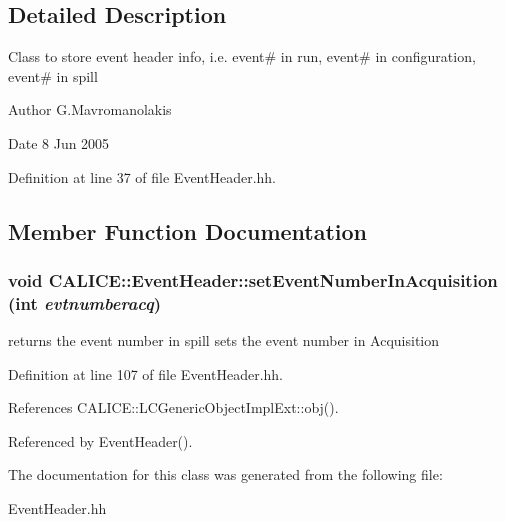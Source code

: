 \subsection{Detailed Description}
Class to store event header info, i.e. event\# in run, event\# in configuration, event\# in spill

\begin{DoxyAuthor}{Author}
G.Mavromanolakis 
\end{DoxyAuthor}
\begin{DoxyDate}{Date}
8 Jun 2005 
\end{DoxyDate}


Definition at line 37 of file EventHeader.hh.

\subsection{Member Function Documentation}
\subsubsection[{setEventNumberInAcquisition}]{\setlength{\rightskip}{0pt plus 5cm}void CALICE::EventHeader::setEventNumberInAcquisition (int {\em evtnumberacq})\hspace{0.3cm}{\ttfamily  [inline]}}\label{classCALICE_1_1EventHeader_abb3fb1c88ad338d9bceba1801f344acd}


returns the event number in spill sets the event number in Acquisition 

Definition at line 107 of file EventHeader.hh.

References CALICE::LCGenericObjectImplExt::obj().

Referenced by EventHeader().

The documentation for this class was generated from the following file:\begin{DoxyCompactItemize}
\item 
EventHeader.hh\end{DoxyCompactItemize}
